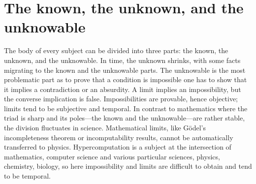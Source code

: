 \documentclass[10pt]{article}
\begin{document}
\section{The known, the unknown, and the unknowable}
The body of every subject can be divided into three parts: the known, the unknown, and the unknowable.
In time, the unknown shrinks, with some facts migrating to the known and the unknowable parts.
The unknowable is the most problematic part as to prove that a condition is impossible one has to show
that it implies a contradiction or an absurdity. A limit implies an impossibility, but the converse implication is false.
Impossibilities are provable, hence objective; limits tend to be subjective and temporal.
In contrast to mathematics where the triad is sharp and its poles---the known and the unknowable---are rather stable,
the division fluctuates in science. Mathematical limits, like G\"odel's incompleteness
theorem or incomputability results, cannot be automatically transferred to physics. Hypercomputation is
a subject at the intersection of mathematics, computer science and various particular sciences, physics, chemistry,
biology, so here impossibility and limits  are difficult to obtain and tend to be temporal.




 
\end{document}
